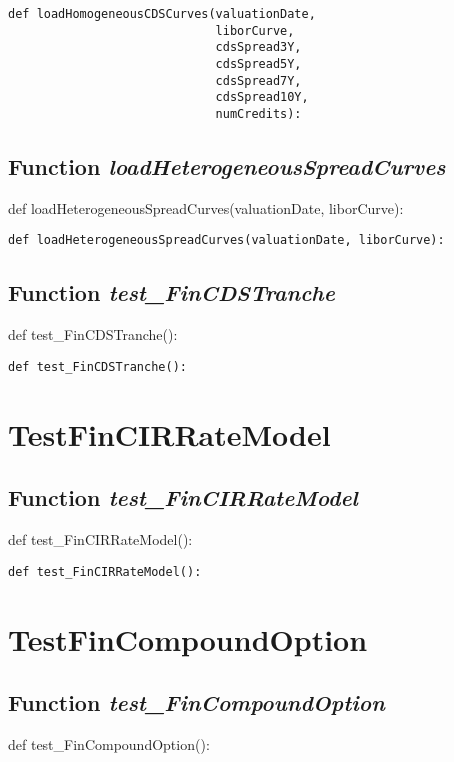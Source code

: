 \documentclass[twoside,11pt]{book}
\begin{document}
\begin{lstlisting}
def loadHomogeneousCDSCurves(valuationDate,
                             liborCurve,
                             cdsSpread3Y,
                             cdsSpread5Y,
                             cdsSpread7Y,
                             cdsSpread10Y,
                             numCredits):
\end{lstlisting}

\subsection{Function {\it loadHeterogeneousSpreadCurves}}
def loadHeterogeneousSpreadCurves(valuationDate, liborCurve):

\begin{lstlisting}
def loadHeterogeneousSpreadCurves(valuationDate, liborCurve):
\end{lstlisting}

\subsection{Function {\it test\_FinCDSTranche}}
def test\_FinCDSTranche():

\begin{lstlisting}
def test_FinCDSTranche():
\end{lstlisting}


\newpage
\section{TestFinCIRRateModel}

\subsection{Function {\it test\_FinCIRRateModel}}
def test\_FinCIRRateModel():

\begin{lstlisting}
def test_FinCIRRateModel():
\end{lstlisting}


\newpage
\section{TestFinCompoundOption}

\subsection{Function {\it test\_FinCompoundOption}}
def test\_FinCompoundOption():
\end{document}
